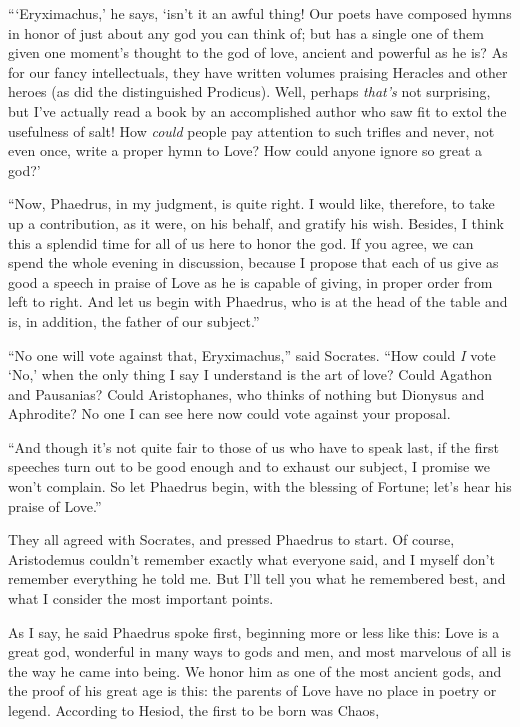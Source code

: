 “‘Eryximachus,' he says, ‘isn't it an awful thing! Our poets have
composed hymns in honor of just about any god you can think of; but has
a single one of them given one moment's thought to the god of
love, ancient and powerful as he is? As for our fancy intellectuals,
they have written volumes praising Heracles and other heroes (as did the
distinguished Prodicus). Well, perhaps {\em that's} not surprising, but
I've actually read a book by an accomplished author who saw fit
to extol the usefulness of salt! How {\em could} people pay attention to
such trifles and never, not even once, write a proper hymn to Love? How
could anyone ignore so great a god?'

“Now, Phaedrus, in my judgment, is quite right. I would like, therefore,
to take up a contribution, as it were, on his behalf, and gratify his
wish. Besides, I think this a splendid time for all of us here
to honor the god. If you agree, we can spend the whole evening in
discussion, because I propose that each of us give as good a speech in
praise of Love as he is capable of giving, in proper order from left to
right. And let us begin with Phaedrus, who is at the head of the table
and is, in addition, the father of our subject.”

“No one will vote against that, Eryximachus,” said Socrates. “How could
{\em I} vote ‘No,' when the only thing I say I understand is the
art of love? Could Agathon and Pausanias? Could Aristophanes, who thinks
of nothing but Dionysus and Aphrodite? No one I can see here now could
vote against your proposal.

“And though it's not quite fair to those of us who have to speak last,
if the first speeches turn out to be good enough and to exhaust our
subject, I promise we won't complain. So let Phaedrus begin, with the
blessing of Fortune; let's hear his praise of Love.”

They all agreed with Socrates, and pressed Phaedrus to start. Of course,
Aristodemus couldn't remember exactly what everyone
said, and I myself don't remember everything he told me. But I'll tell
you what he remembered best, and what I consider the most important
points.

As I say, he said Phaedrus spoke first, beginning more or less like
this:
\blank[line]
Love is a great god, wonderful in many ways to gods and men, and most
marvelous of all is the way he came into being. We honor him as one of
the most ancient gods, and the proof of his great age is this: the 
parents of Love have no place in poetry or legend. According to
Hesiod, the first to be born was Chaos,

